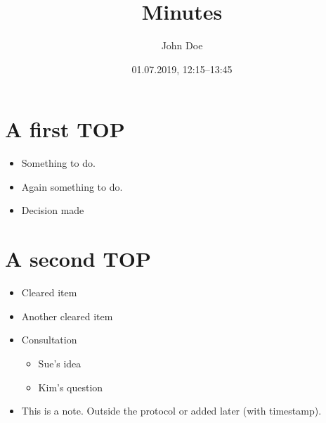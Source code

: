 \documentclass[11pt]{article}
\author{John Doe}
\date{01.07.2019, 12:15--13:45}
\title{Minutes}
\begin{document}
\maketitle
\tableofcontents


\section{\texorpdfstring{}{}A first TOP}
\label{sec:org4f4cd7e}
\begin{itemize}
\item {} Something to do.
\item \ActionTag{}{::} \ActionTagMargin{}Again something to do.
\item \EntscheidungTag{}{::} \EntscheidungTagMargin{ }Decision made
\end{itemize}
\section{A second TOP}
\label{sec:org2a0e34c}
\begin{itemize}
\item \ClearedTag{}{::} \ClearedTagMargin{ }Cleared item
\item \ClearedTag{}{::} \ClearedTagMargin{ }Another cleared item
\item \ConsultationTag{}{::} \ConsultationTagMargin{ }Consultation 
\begin{itemize}
\item {}Sue's idea
\item {}Kim's question
\end{itemize}
\item \NoteTag{}{::}This is a note. Outside the protocol or added later (with timestamp).
\end{itemize}
\end{document}
